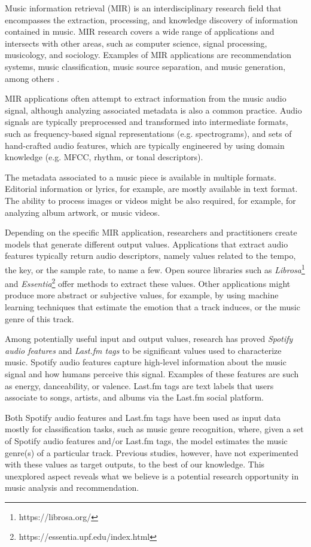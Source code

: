 \documentclass[sn-mathphys]{sn-jnl}%
\theoremstyle{thmstyleone}%
\theoremstyle{thmstyletwo}%
\theoremstyle{thmstylethree}%
\begin{document}
Music information retrieval (MIR) is an interdisciplinary research field that encompasses the extraction,
processing, and knowledge discovery of information contained in music.
MIR research covers a wide range of applications and intersects with other areas, such as computer science, signal processing, musicology, and sociology.
Examples of MIR applications are recommendation systems, music classification,
music source separation, and music generation, among others \cite{ramirez2020machine}.

MIR applications often attempt to extract information from the music audio signal,
although analyzing associated metadata is also a common practice.
Audio signals are typically preprocessed and transformed into intermediate formats, such as frequency-based signal representations (e.g. spectrograms),
and sets of hand-crafted audio features, which are typically engineered by using domain knowledge (e.g. MFCC, rhythm, or tonal descriptors).

The metadata associated to a music piece is available in multiple formats.
Editorial information or lyrics, for example, are mostly available in text format.
The ability to process images or videos might be also required, for example, for analyzing album artwork, or music videos.

Depending on the specific MIR application, researchers and practitioners create models that generate different output values.
Applications that extract audio features typically return audio descriptors, namely values related to the tempo, the key, or the sample rate, to name a few.
Open source libraries such as \emph{Librosa}\footnote[1]{https://librosa.org/}
and \emph{Essentia}\footnote[2]{https://essentia.upf.edu/index.html} offer methods to extract these values.
Other applications might produce more abstract or subjective values, for example, by using machine learning techniques
that estimate the emotion that a track induces, or the music genre of this track.

Among potentially useful input and output values, research has proved \emph{Spotify audio features} and \emph{Last.fm tags} to be significant values used to  characterize music.
Spotify audio features capture high-level information about the music signal and how humans perceive this signal.
Examples of these features are such as energy, danceability, or valence.
Last.fm tags are text labels that users associate to songs, artists, and albums via the Last.fm social platform.

Both Spotify audio features and Last.fm tags have been used as input data mostly for classification tasks, such as music genre recognition,
where, given a set of Spotify audio features and/or Last.fm tags, the model estimates the music genre(s) of a particular track.
Previous studies, however, have not experimented with these values as target outputs, to the best of our knowledge.
This unexplored aspect reveals what we believe is a potential research opportunity in music analysis and recommendation.
\end{document}
